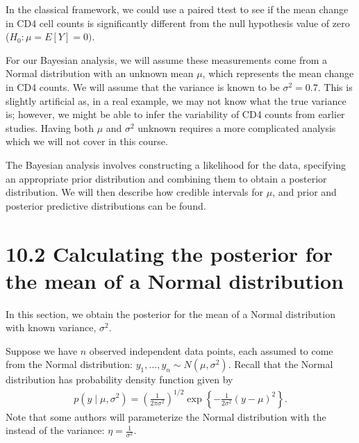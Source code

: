 \documentclass[letterpaper,10pt,english]{jupyterBook}
\begin{document}
\sphinxAtStartPar
In the classical framework, we could use a paired t\sphinxhyphen{}test to see if the mean change in CD4 cell counts is significantly different from the null hypothesis value of zero (\(H_0: \mu = E[Y]=0)\).

\sphinxAtStartPar
For our Bayesian analysis, we will assume these measurements come from a Normal distribution with an unknown mean \(\mu\),
which represents the mean change in CD4 counts. We will assume that the variance is known to be \(\sigma^2 = 0.7\). This is slightly artificial as, in a real example, we may not know what the true variance is; however, we might be able to infer the variability of CD4 counts from earlier studies. Having both \(\mu\) and \(\sigma^2\) unknown requires a more complicated analysis which we will not cover in this course.

\sphinxAtStartPar
The Bayesian analysis involves constructing a likelihood for the data, specifying an appropriate prior distribution and combining them to obtain a posterior distribution. We will then describe how credible intervals for \(\mu\), and prior and posterior predictive distributions can be found.


\section{10.2 Calculating the posterior for the mean of a Normal distribution}
\label{\detokenize{10.c. Bayesian Statistics II:calculating-the-posterior-for-the-mean-of-a-normal-distribution}}\label{\detokenize{10.c. Bayesian Statistics II::doc}}
\sphinxAtStartPar
In this section, we obtain the posterior for the mean of a Normal distribution with known variance, \(\sigma^2\).

\sphinxAtStartPar
Suppose we have \(n\) observed independent data points, each assumed to come from the Normal distribution: \(y_1,\dots,y_n \sim N(\mu,\sigma^2)\). Recall that the Normal distribution has probability density function given by
\begin{equation*}
\begin{split}
p(y \mid \mu, \sigma^2) = \left( \frac{1}{2\pi\sigma^2} \right)^{1/2} 
\exp\left\{-\frac{1}{2\sigma^2}(y-\mu)^2\right\}.
\end{split}
\end{equation*}
\sphinxAtStartPar
Note that some authors will parameterize the Normal distribution with the  instead of the variance: \(\eta=\frac{1}{\sigma^2}\).
\end{document}
